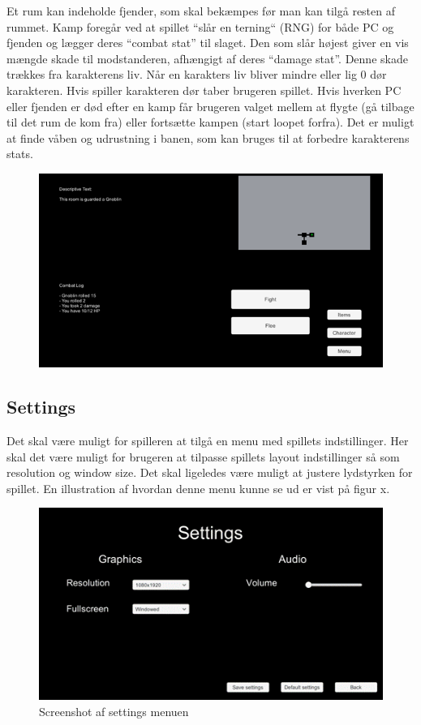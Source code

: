 Et rum kan indeholde fjender, som skal bekæmpes før man kan tilgå resten af rummet. Kamp foregår ved at spillet “slår en terning“ (RNG) for både PC og fjenden og lægger deres “combat stat” til slaget. Den som slår højest giver en vis mængde skade til modstanderen, afhængigt af deres “damage stat”. Denne skade trækkes fra karakterens liv. Når en karakters liv bliver mindre eller lig 0 dør karakteren. Hvis spiller karakteren dør taber brugeren spillet.  Hvis hverken PC eller fjenden er død efter en kamp får brugeren valget mellem at flygte (gå tilbage til det rum de kom fra) eller fortsætte kampen (start loopet forfra). 
Det er muligt at finde våben og udrustning i banen, som kan bruges til at forbedre karakterens stats. 

\begin{figure}[H]
\centering
\includegraphics[width = \textwidth]{02-Body/Images/CombatScreen-udkast.png}
\caption{}
\label{fig:Combat-udkast}
\end{figure}

\subsection{Settings}
Det skal være muligt for spilleren at tilgå en menu med spillets indstillinger. Her skal det være muligt for brugeren at tilpasse spillets layout indstillinger så som resolution og window size. Det skal ligeledes være muligt at justere lydstyrken for spillet. En illustration af hvordan denne menu kunne se ud er vist på figur x.

\begin{figure}[H]
\centering
\includegraphics[width = \textwidth]{02-Body/Images/SettingsMenu-udkast.png}
\caption{Screenshot af settings menuen}
\label{fig:Settings-udkast}
\end{figure}
